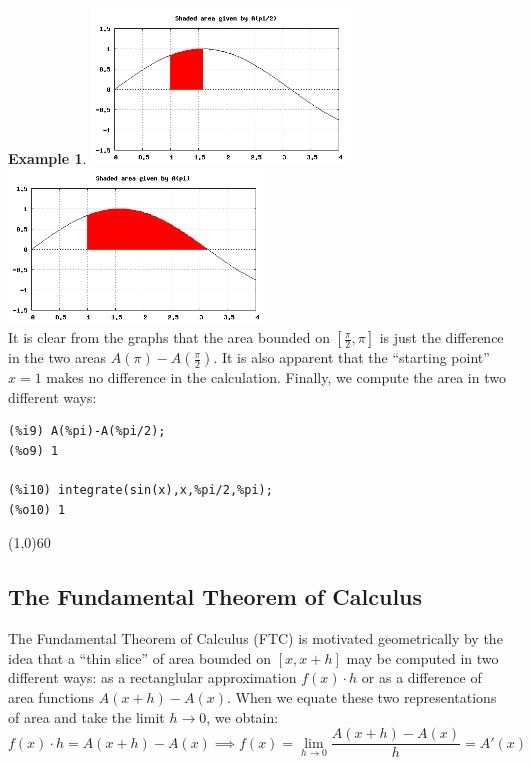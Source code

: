 \documentclass[10.5pt,twoside]{report}
\theoremstyle{definition}
\newtheorem{exmp}{Example}[section]
\begin{document}
\begin{exmp}
\includegraphics[width=2.7in]{example_1_1_2_1}
\includegraphics[width=2.7in]{example_1_1_2_2}
${}$\\

It is clear from the graphs that the area bounded on $[\frac{\pi}{2},\pi]$ is just the difference in the two areas $A(\pi)-A(\frac{\pi}{2})$.  It is also apparent that the ``starting point'' $x=1$ makes no difference in the calculation.  Finally, we compute the area in two different ways:

\begin{verbatim}
(%i9) A(%pi)-A(%pi/2);
(%o9) 1

(%i10) integrate(sin(x),x,%pi/2,%pi);
(%o10) 1
\end{verbatim}


\end{exmp}

\line(1,0){60}
\linethickness{0.5mm}
\pagebreak

\subsection{The Fundamental Theorem of Calculus}

The Fundamental Theorem of Calculus (FTC) is motivated geometrically by the idea that a ``thin slice'' of area bounded on $[x,x+h]$ may be computed in two different ways:  as a rectanglular approximation $f(x)\cdot h$ or as a difference of area functions $A(x+h)-A(x)$.  When we equate these two representations of area and take the limit $h \to 0$, we obtain:
\[f(x)\cdot h=A(x+h)-A(x) \implies f(x)=\lim_{h \to 0} \frac{A(x+h)-A(x)}{h} = A'(x)\]
\end{document}
